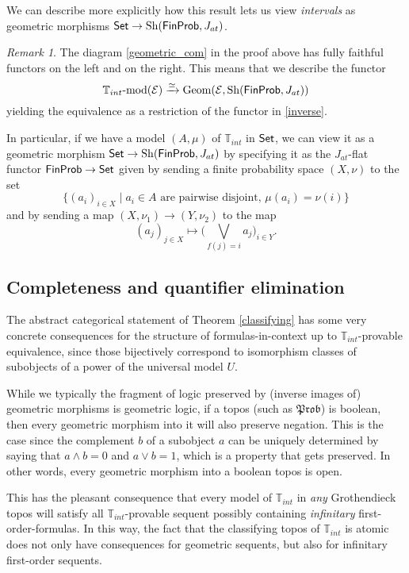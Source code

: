\documentclass[a4paper]{amsproc}
\theoremstyle{plain}
\theoremstyle{definition}
\theoremstyle{remark}
\newtheorem{remark}[theorem]{Remark}
\numberwithin{equation}{section}
\DeclareMathOperator{\Sh}{Sh}
\DeclareMathOperator{\Geom}{Geom}
\newcommand{\Set}{\textup{\textsf{Set}}}
\newcommand{\FinProb}{\textup{\textsf{FinProb}}}
\newcommand{\Prob}{\mathfrak{Prob}}
\begin{document}
We can describe more explicitly how this result lets us view \emph{intervals} as geometric morphisms $\Set \to \Sh(\FinProb,J_{at})$.

\begin{remark} \label{classifying_equiv_data}
    The diagram \ref{geometric_com} in the proof above has fully faithful functors on the left and on the right. This means that we describe the functor
    \[
        \mathbb{T}_{int}\textup{-mod}(\mathcal{E}) \xrightarrow{\simeq} \Geom(\mathcal{E},\Sh(\FinProb,J_{at}))
    \]
    yielding the equivalence as a restriction of the functor in \ref{inverse}.
    
    In particular, if we have a model $(A,\mu)$ of $\mathbb{T}_{int}$ in $\Set$, we can view it as a geometric morphism $\Set \to \Sh(\FinProb, J_{at})$ by specifying it as the $J_{at}$-flat functor $\FinProb \to \Set$ given by sending a finite probability space $(X,\nu)$ to the set
    \[
    \{(a_i)_{i \in X} \mid a_i \in A \text{ are pairwise disjoint, } \mu(a_i) = \nu(i) \}
    \]
    and by sending a map $(X,\nu_1) \to (Y,\nu_2)$ to the map
    \[
    (a_j)_{j \in X} \mapsto \big (\bigvee_{f(j) = i} a_j \big )_{i \in Y} .
    \]
\end{remark}

\subsection{Completeness and quantifier elimination}

The abstract categorical statement of Theorem \ref{classifying} has some very concrete consequences for the structure of formulas-in-context up to $\mathbb{T}_{int}$-provable equivalence, since those bijectively correspond to isomorphism classes of subobjects of a power of the universal model $U$.

While we typically the fragment of logic preserved by (inverse images of) geometric morphisms is geometric logic, if a topos (such as $\Prob$) is boolean, then every geometric morphism into it will also preserve negation. This is the case since the complement $b$ of a subobject $a$ can be uniquely determined by saying that $a \wedge b = 0$ and $a \vee b = 1$, which is a property that gets preserved. In other words, every geometric morphism into a boolean topos is open.

This has the pleasant consequence that every model of $\mathbb{T}_{int}$ in \emph{any} Grothendieck topos will satisfy all $\mathbb{T}_{int}$-provable sequent possibly containing \emph{infinitary} first-order-formulas. In this way, the fact that the classifying topos of $\mathbb{T}_{int}$ is atomic does not only have consequences for geometric sequents, but also for infinitary first-order sequents.
\end{document}
